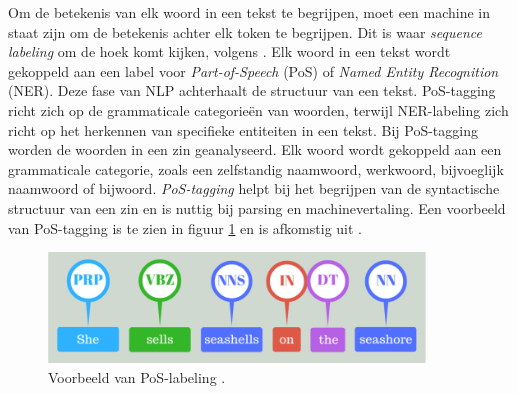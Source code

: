 \medspace

Om de betekenis van elk woord in een tekst te begrijpen, moet een machine in staat zijn om de betekenis achter elk token te begrijpen. Dit is waar \textit{sequence labeling} om de hoek komt kijken, volgens \textcite{Eisenstein2019}. Elk woord in een tekst wordt gekoppeld aan een label voor \textit{Part-of-Speech} (PoS) of \textit{Named Entity Recognition} (NER). Deze fase van NLP achterhaalt de structuur van een tekst. PoS-tagging richt zich op de grammaticale categorieën van woorden, terwijl NER-labeling zich richt op het herkennen van specifieke entiteiten in een tekst. Bij PoS-tagging worden de woorden in een zin geanalyseerd. Elk woord wordt gekoppeld aan een grammaticale categorie, zoals een zelfstandig naamwoord, werkwoord, bijvoeglijk naamwoord of bijwoord. \textit{PoS-tagging} helpt bij het begrijpen van de syntactische structuur van een zin en is nuttig bij parsing en machinevertaling. Een voorbeeld van PoS-tagging is te zien in figuur \ref{fig:pos-labeling} en is afkomstig uit \textcite{Bilisci2021}.

\begin{center}
	\begin{figure}[H]
		\includegraphics[width=10cm]{img/poslabeling.png}
		\caption{Voorbeeld van PoS-labeling \autocite{Bilisci2021}.}
		\label{fig:pos-labeling}
	\end{figure}
\end{center}

\medspace

